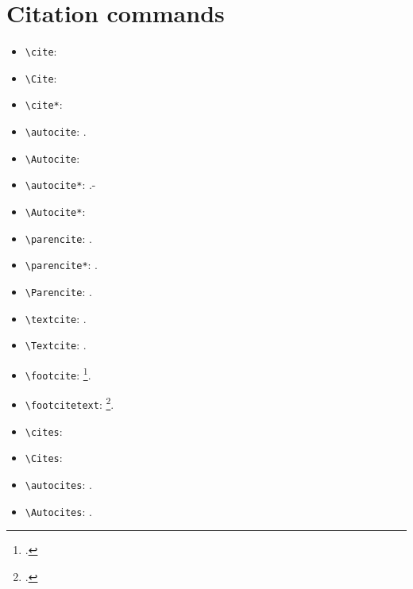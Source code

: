 \documentclass[a4paper,12pt]{scrartcl}
\newcommand{\Befehl}[1]{\texttt{\textbackslash#1}}
\begin{document}
\section{Citation commands}

\begin{itemize}
	\item\Befehl{cite}: \cite[159--187]{auler:hiller:2015}
	\item\Befehl{Cite}: \Cite[159--187]{auler:hiller:2015}
	\item\Befehl{cite*}: \cite*[159--187]{auler:hiller:2015}
	\item\Befehl{autocite}: \autocite[159--187]{auler:hiller:2015}.
	\item\Befehl{Autocite}: \Autocite[159--187]{auler:hiller:2015}
	\item\Befehl{autocite*}: \autocite*[159--187]{auler:hiller:2015}.-
	\item\Befehl{Autocite*}: \Autocite*[159--187]{auler:hiller:2015}
	\item\Befehl{parencite}: \parencite[159--187]{auler:hiller:2015}.
	\item\Befehl{parencite*}: \parencite*[159--187]{auler:hiller:2015}.
	\item\Befehl{Parencite}: \Parencite[159--187]{auler:hiller:2015}.
	\item\Befehl{textcite}: \textcite[159--187]{auler:hiller:2015}.
	\item\Befehl{Textcite}: \Textcite[159--187]{auler:hiller:2015}.
	\item\Befehl{footcite}: \footcite[159--187]{auler:hiller:2015}.
	\item\Befehl{footcitetext}: \footcitetext[159--187]{auler:hiller:2015}.
	\item\Befehl{cites}: \cites[159--187]{auler:hiller:2015}
	\item\Befehl{Cites}: \Cites[159--187]{auler:hiller:2015}
	\item\Befehl{autocites}: \autocites[68]{auler:hiller:2011}[48]{auler:hiller:2015a}[159--187]{auler:hiller:2015}[40--41]{auler:hiller:2016}[15--23]{tacitus:1981}[19]{de:neck:yoder:1978}.
	\item\Befehl{Autocites}: \Autocites[68]{auler:hiller:2011}[48]{auler:hiller:2015a}[159--187]{auler:hiller:2015}[40--41]{auler:hiller:2016}[15--23]{tacitus:1981}[19]{de:neck:yoder:1978}.

\end{itemize}
\end{document}
